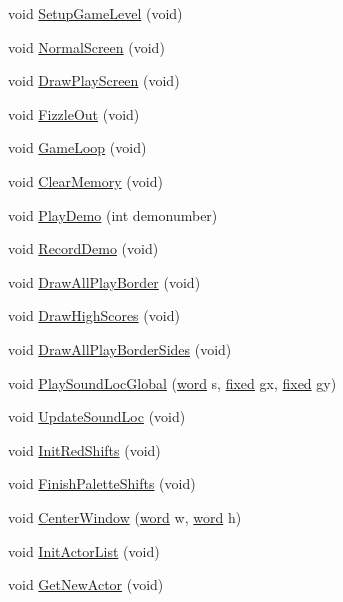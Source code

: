 \begin{DoxyCompactItemize}
void \hyperlink{WL__DEF_8H_a272fa7f65051688198cb04c666d9977a}{SetupGameLevel} (void)
\item 
void \hyperlink{WL__DEF_8H_ace97d70d8202b585f880cdbcc26f3a20}{NormalScreen} (void)
\item 
void \hyperlink{WL__DEF_8H_ad8f8ba380685262789e9d6931e35e34a}{DrawPlayScreen} (void)
\item 
void \hyperlink{WL__DEF_8H_a1fbc13770fef766872ac02c82e5fd661}{FizzleOut} (void)
\item 
void \hyperlink{WL__DEF_8H_aceb580a0e9c038f9f4a99672883b287a}{GameLoop} (void)
\item 
void \hyperlink{WL__DEF_8H_aef10ed8266c6a98e92c5d6543e7035d6}{ClearMemory} (void)
\item 
void \hyperlink{WL__DEF_8H_a55c9fa06b5f7b6dc6805e3721a15922a}{PlayDemo} (int demonumber)
\item 
void \hyperlink{WL__DEF_8H_aad40e6bfb5d6c51cef4fb25993b309bb}{RecordDemo} (void)
\item 
void \hyperlink{WL__DEF_8H_aa703cd8f27efe292d32fb1ed8ae14004}{DrawAllPlayBorder} (void)
\item 
void \hyperlink{WL__DEF_8H_a249116c49fb1a498be1ac71aac320343}{DrawHighScores} (void)
\item 
void \hyperlink{WL__DEF_8H_a1b9ab4e752bcb2c76b53d7fa2390c3e0}{DrawAllPlayBorderSides} (void)
\item 
void \hyperlink{WL__DEF_8H_ac828a2af8db4f7ce66a84a69313e37ef}{PlaySoundLocGlobal} (\hyperlink{ID__HEAD_8H_abad51e07ab6d26bec9f1f786c8d65bcd}{word} s, \hyperlink{WL__DEF_8H_aaf54715c9b83afe8794059fcf5fd5e7e}{fixed} gx, \hyperlink{WL__DEF_8H_aaf54715c9b83afe8794059fcf5fd5e7e}{fixed} gy)
\item 
void \hyperlink{WL__DEF_8H_a616d397cb4e4bb994034cf07913567fc}{UpdateSoundLoc} (void)
\item 
void \hyperlink{WL__DEF_8H_ae062cb46486d374e2bbd2a68c3fd6a96}{InitRedShifts} (void)
\item 
void \hyperlink{WL__DEF_8H_aa8f57ca7046b2d2a91ed59450822ecbc}{FinishPaletteShifts} (void)
\item 
void \hyperlink{WL__DEF_8H_a673946129c833c78df674cf8b38fdd61}{CenterWindow} (\hyperlink{ID__HEAD_8H_abad51e07ab6d26bec9f1f786c8d65bcd}{word} w, \hyperlink{ID__HEAD_8H_abad51e07ab6d26bec9f1f786c8d65bcd}{word} h)
\item 
void \hyperlink{WL__DEF_8H_a8d7a0f55f08fed814aee83d9376482cd}{InitActorList} (void)
\item 
void \hyperlink{WL__DEF_8H_abf7aec13a61bd972c2756f07143abf80}{GetNewActor} (void)

\end{DoxyCompactItemize}
